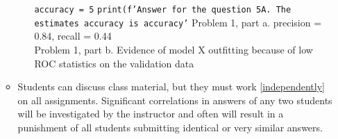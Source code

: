 \documentclass[11pt]{article}
\begin{document}
\begin{itemize}
\begin{itemize}
\begin{itemize}
        \texttt{accuracy = 5} \newline
        \texttt{print(f'Answer for the question 5A. The estimates accuracy is {accuracy}'}
        Problem 1, part a. precision = 0.84, recall = 0.44 \\
        Problem 1, part b. Evidence of model X outfitting because of low ROC statistics on the validation data   \\
  \end{itemize}
		\item  Students can discuss class material, but they must work \ref{independently} on all assignments. Significant correlations in answers of any two students will be investigated by the instructor and often will result in a punishment of all students submitting identical or very similar answers. 
		\end{itemize}
\end{itemize}
\end{document}
